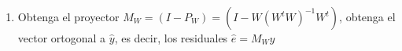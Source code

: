 \documentclass[12pt,a4paper]{report}
\begin{document}
\begin{enumerate}
\begin{enumerate}
\begin{eqnarray*}
\widehat{y} &=& P_W y = 
\begin{bmatrix}
\frac{1}{3} & \frac{1}{3} & \frac{1}{3} & 0 & 0 & 0 \\
\frac{1}{3} & \frac{1}{3} & \frac{1}{3} & 0 & 0 & 0 \\
\frac{1}{3} & \frac{1}{3} & \frac{1}{3} & 0 & 0 & 0 \\
0 & 0 & 0 & \frac{1}{2} & \frac{1}{2} & 0 \\
0 & 0 & 0 & \frac{1}{2} & \frac{1}{2} & 0 \\
0 & 0 & 0 & 0 & 0 & 1
\end{bmatrix}
\begin{bmatrix}
2 \\
1 \\
0 \\
7 \\
9 \\
3
\end{bmatrix} =
\begin{bmatrix}
1 \\
1 \\
1 \\
8 \\
8 \\
3
\end{bmatrix}
\end{eqnarray*}


\item[4.] Obtenga el proyector $M_W = (I - P_W ) = (I - W(W^tW)^{-1}W^t)$, obtenga el vector ortogonal a $\widehat{y}$, es decir, los residuales $\widehat{e} = M_W y$



\end{enumerate}
\end{enumerate}
\end{document}
